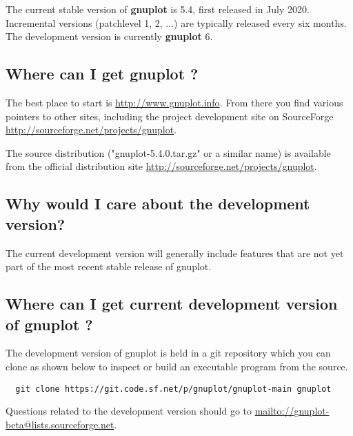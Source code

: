 \documentclass[letter,11pt]{article}
\def\http#1{{\small\href{http://#1}{\url{http://#1}}}}
\def\mailto#1{{\small\href{mailto://#1}{\url{mailto://#1}}}}
\newcommand{\mailto}[1]%
            {\htmladdnormallink{\latex{\url{<#1>}}\html{\textit{#1}}}%
                {mailto:#1}%
            }
\newcommand{\http}[1]%
            {\htmladdnormallink{\latex{\url{http://#1}}%
                    \html{\textit{http://#1}}}%
                {http://#1}%
            }
\newcommand{\gnuplot}{\textbf{gnuplot }}
\begin{document}
{The current stable version of \gnuplot is 5.4, first released in July 2020.
Incremental versions (patchlevel 1, 2, ...) are typically released every six months.
The development version is currently \gnuplot 6.

\subsection{Where can I get \gnuplot?}
\label{where-get-gnuplot}

The best place to start is \http{www.gnuplot.info}. From there
you find various pointers to other sites, including the project
development site on SourceForge \http{sourceforge.net/projects/gnuplot}.

The source distribution ("gnuplot-5.4.0.tar.gz" or a similar name) is
available from the official distribution site \http{sourceforge.net/projects/gnuplot}.

\subsection{Why would I care about the development version?}

The current development version will generally include features that are
not yet part of the most recent stable release of gnuplot.

\subsection{Where can I get current development version of \gnuplot?}

The development version of gnuplot is held in a git repository which you
can clone as shown below to inspect or build an executable program
from the source.

\scriptsize
\begin{verbatim}
  git clone https://git.code.sf.net/p/gnuplot/gnuplot-main gnuplot
\end{verbatim}
\normalsize

Questions related to the development version should go to
\mailto{gnuplot-beta@lists.sourceforge.net}.


}
\end{document}
